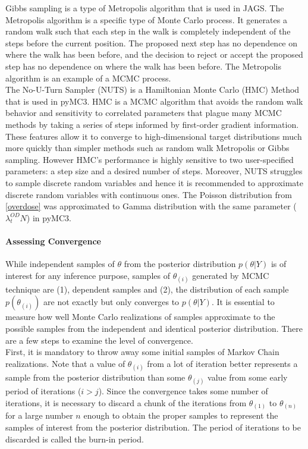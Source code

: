 \documentclass[12pt]{article}
\begin{document}
{Gibbs sampling is a type of Metropolis algorithm that is used in JAGS. The Metropolis algorithm is a specific type of Monte Carlo process. It generates a random walk such that each step in the walk is completely independent of the steps before the current position. The proposed next step has no dependence on where the walk has been before, and the decision to reject or accept the proposed step has no dependence on where the walk has been before. The Metropolis algorithm is an example of a MCMC process. \cite{doing_bayes} \\

The No-U-Turn Sampler (NUTS) is a Hamiltonian Monte Carlo (HMC) Method that is used in pyMC3. HMC is a MCMC algorithm that avoids the random walk behavior and sensitivity to correlated parameters that plague many MCMC methods by taking a series of steps informed by first-order gradient information. These features allow it to converge to high-dimensional target distributions much more quickly than simpler methods such as random walk Metropolis or Gibbs sampling. However HMC’s performance is highly sensitive to two user-specified parameters: a step size and a desired number of steps. \cite{hoffman2011nouturn} Moreover, NUTS struggles to sample discrete random variables and hence it is recommended to approximate discrete random variables with continuous ones. The Poisson distribution from \ref{overdose} was approximated to Gamma distribution with the same parameter ($\lambda_{t}^{OD}N$) in pyMC3.

\paragraph{Assessing Convergence}

While independent samples of $\theta$ from the posterior distribution $p(\theta|Y)$ is of interest for any inference purpose, samples of $\theta_{(i)}$ generated by MCMC technique are (1), dependent samples and (2), the distribution of each sample $p(\theta_{(i)})$ are not exactly but only converges to $p(\theta|Y)$. It is essential to measure how well Monte Carlo realizations of samples approximate to the possible samples from the independent and identical posterior distribution. There are a few steps to examine the level of convergence.\\

First, it is mandatory to throw away some initial samples of Markov Chain realizations. Note that a value of $\theta_{(i)}$  from a lot of iteration better represents a sample from the posterior distribution than some $\theta_{(j)}$ value from some early period of iterations ($i > j$). Since the convergence takes some number of iterations, it is necessary to discard a chunk of the iterations from $\theta_{(1)}$ to $\theta_{(n)}$ for a large number $n$ enough to obtain the proper samples to represent the samples of interest from the posterior distribution. The period of iterations to be discarded is called the burn-in period.
\\

}
\end{document}
